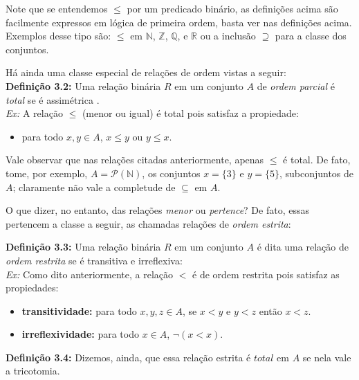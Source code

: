 \noindent Note que se entendemos $\leq$ por um predicado binário, as definições acima são facilmente expressos em lógica de primeira ordem, basta ver nas definições acima.
Exemplos desse tipo são: $\leq$ em $\mathbb{N}$, $\mathbb{Z}$, $\mathbb{Q}$, e $\mathbb{R}$ ou a inclusão $\supseteq$ para a classe dos conjuntos.

Há ainda uma classe especial de relações de ordem vistas a seguir:\\

    \textbf{Definição 3.2:} Uma relação binária $R$ em um conjunto $A$ de \textit{ordem parcial} é \textit{total} se é assimétrica .\\
    
    \textit{Ex:} A relação $\leq$ (menor ou igual) é total pois satisfaz a propiedade:

    \begin{itemize}
        \item para todo $x, y \in A$, $x\leq y$ ou $y\leq x$.
    \end{itemize}


\noindent Vale observar que nas relações citadas anteriormente, apenas $\leq$ é total.
De fato, tome, por exemplo, $A = \mathcal{P}(\mathbb{N}) $, os conjuntos $x=\{3\}$ e $y=\{5\}$, subconjuntos de $A$; claramente não vale a completude de $\subseteq$ em $A$. %

O que dizer, no entanto, das relações \textit{menor} ou \textit{pertence}? De fato, essas pertencem a classe a seguir, as chamadas relações de \textit{ordem estrita}:


    \textbf{Definição 3.3:} Uma relação binária $R$ em um conjunto $A$ é dita uma relação de \textit{ordem restrita} se é transitiva e irreflexiva:\\
    
    \textit{Ex:} Como dito anteriormente, a relação $<$ é de ordem restrita pois satisfaz as propiedades:

    \begin{itemize}
        \item \textbf{transitividade: } para todo $x,y,z \in A$, se $x<y$ e $y<z$ então $x<z$.
        \item \textbf{irreflexividade: } para todo $x\in A$, $\neg(x< x)$.
    \end{itemize}
 

  
    \textbf{Definição 3.4:} Dizemos, ainda, que essa relação estrita é $total$ em $A$ se nela vale a tricotomia.\\
    

